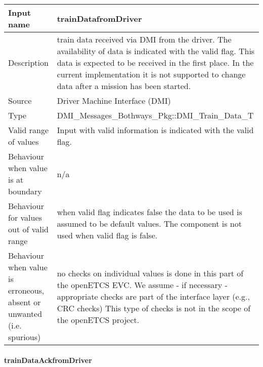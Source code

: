 \begin{longtable}{p{}p{}}
\toprule
Input name				& trainDatafromDriver \\
\midrule
Description				& train data received via DMI from the driver. The availability of data is indicated with the valid flag. This data is expected to be received in the first place. In the current implementation it is not supported to change data after a mission has been started.\\
\midrule
Source					& Driver Machine Interface (DMI) \\ 
\midrule
Type					& DMI\_Messages\_Bothways\_Pkg::DMI\_Train\_Data\_T \\
\midrule
Valid range of values	& Input with valid information is indicated with the valid flag. \\
\midrule
Behaviour when value is at boundary	& n/a\\
\midrule
Behaviour for values out of valid range	& when valid flag indicates false the data to be used is assumed to be default values. The component is not used when valid flag is false.\\
\midrule
Behaviour when value is erroneous, absent or unwanted (i.e. spurious) & no checks on individual values is done in this part of the openETCS EVC. We assume - if necessary - appropriate checks are part of the interface layer (e.g., CRC checks) This type of checks is not in the scope of the openETCS project.\\
\bottomrule

\end{longtable}

\paragraph{trainDataAckfromDriver}


